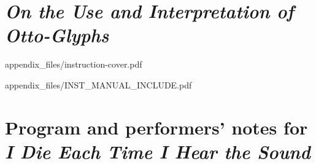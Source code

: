 
\appendix
\chapter{\textit{On the Use and Interpretation of Otto-Glyphs}}


    
    {appendix_files/instruction-cover.pdf}
    
    
    {appendix_files/INST_MANUAL_INCLUDE.pdf}
    

\chapter{Program and performers' notes for \textit{I Die Each Time I Hear the Sound}}
    
        

        
            
